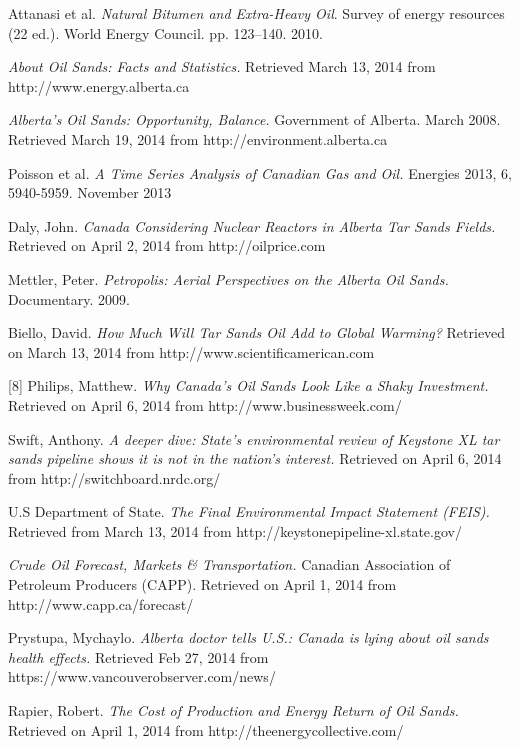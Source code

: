 \documentclass[12pt]{article}
\begin{document}
\newpage
\begin{thebibliography}{9}


 Attanasi et al.  \emph{Natural Bitumen and Extra-Heavy Oil}. Survey of energy resources (22 ed.). World Energy Council. pp. 123–140. 2010.

 \emph{About Oil Sands: Facts and Statistics.} Retrieved March 13, 2014 from
http://www.energy.alberta.ca

 \emph{Alberta's Oil Sands: Opportunity, Balance.} Government of Alberta. March 2008. Retrieved March 19, 2014 from http://environment.alberta.ca

Poisson et al.  \emph{A Time Series Analysis of Canadian Gas and Oil.} Energies 2013, 6, 5940-5959. November 2013

Daly, John.  \emph{Canada Considering Nuclear Reactors in Alberta Tar Sands Fields.} Retrieved on April 2, 2014 from http://oilprice.com 

Mettler, Peter.  \emph{Petropolis: Aerial Perspectives on the Alberta Oil Sands.}
Documentary. 2009.

Biello, David.  \emph{How Much Will Tar Sands Oil Add to Global Warming?} Retrieved on March 13, 2014 from http://www.scientificamerican.com

[8] Philips, Matthew.  \emph{Why Canada’s Oil Sands Look Like a Shaky Investment.} Retrieved on April 6, 2014 from http://www.businessweek.com/ 

Swift, Anthony.  \emph{A deeper dive: State’s environmental review of Keystone XL tar sands pipeline shows it is not in the nation’s interest.} Retrieved on April 6, 2014 from http://switchboard.nrdc.org/ 

U.S Department of State.  \emph{The Final Environmental Impact Statement (FEIS).} Retrieved from March 13, 2014 from http://keystonepipeline-xl.state.gov/

 \emph{Crude Oil Forecast, Markets \& Transportation.} Canadian Association of Petroleum Producers (CAPP). Retrieved on April 1, 2014 from http://www.capp.ca/forecast/

Prystupa, Mychaylo.  \emph{Alberta doctor tells U.S.: Canada is lying about oil sands health effects.} Retrieved Feb 27, 2014 from https://www.vancouverobserver.com/news/

Rapier, Robert.  \emph{The Cost of Production and Energy Return of Oil Sands.} Retrieved on April 1, 2014 from http://theenergycollective.com/


\end{thebibliography}
\end{document}
